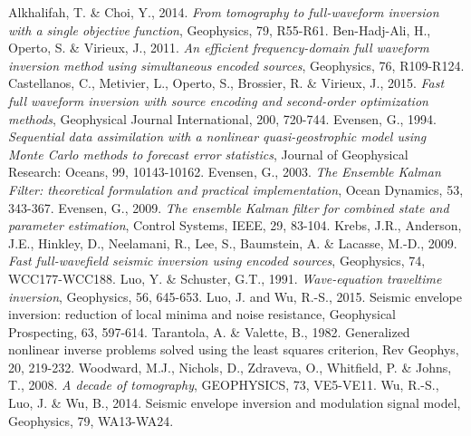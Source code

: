 \documentclass[mreferee]{gji}
\begin{document}
\begin{thebibliography}{}
   Alkhalifah, T. \& Choi, Y., 2014. \textit{From tomography to full-waveform inversion with a single objective function}, Geophysics, 79, R55-R61.
   Ben-Hadj-Ali, H., Operto, S. \& Virieux, J., 2011. \textit{An efficient frequency-domain full waveform inversion method using simultaneous encoded sources}, Geophysics, 76, R109-R124.
    Castellanos, C., Metivier, L., Operto, S., Brossier, R. \& Virieux, J., 2015. \textit{Fast full waveform inversion with source encoding and second-order optimization methods}, Geophysical Journal International, 200, 720-744.
    Evensen, G., 1994. \textit{Sequential data assimilation with a nonlinear quasi-geostrophic model using Monte Carlo methods to forecast error statistics}, Journal of Geophysical Research: Oceans, 99, 10143-10162.
   Evensen, G., 2003. \textit{The Ensemble Kalman Filter: theoretical formulation and practical implementation}, Ocean Dynamics, 53, 343-367.
   Evensen, G., 2009. \textit{The ensemble Kalman filter for combined state and parameter estimation}, Control Systems, IEEE, 29, 83-104.
   Krebs, J.R., Anderson, J.E., Hinkley, D., Neelamani, R., Lee, S., Baumstein, A. \& Lacasse, M.-D., 2009. \textit{Fast full-wavefield seismic inversion using encoded sources}, Geophysics, 74, WCC177-WCC188.
   Luo, Y. \& Schuster, G.T., 1991. \textit{Wave-equation traveltime inversion}, Geophysics, 56, 645-653.
 Luo, J. and Wu, R.-S., 2015. Seismic envelope inversion: reduction of local minima and noise resistance, Geophysical Prospecting, 63, 597-614.
 Tarantola, A. \& Valette, B., 1982. Generalized nonlinear inverse problems solved using the least squares criterion, Rev Geophys, 20, 219-232.
 Woodward, M.J., Nichols, D., Zdraveva, O., Whitfield, P. \& Johns, T., 2008. \textit{A decade of tomography}, GEOPHYSICS, 73, VE5-VE11.
 Wu, R.-S., Luo, J. \& Wu, B., 2014. Seismic envelope inversion and modulation signal model, Geophysics, 79, WA13-WA24.

\end{thebibliography}
\end{document}
